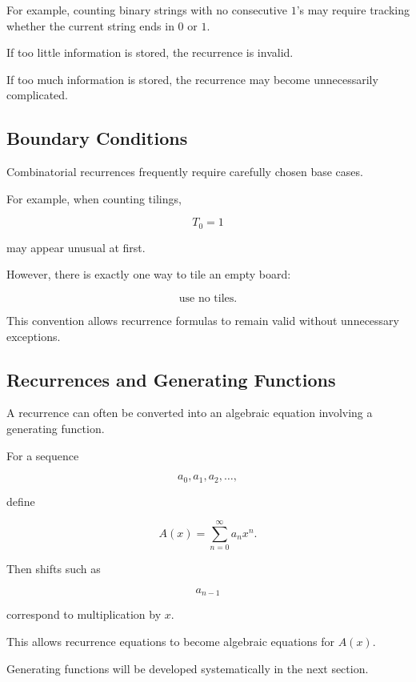For example, counting binary strings with no consecutive \(1\)'s may
require tracking whether the current string ends in \(0\) or \(1\).

If too little information is stored, the recurrence is invalid.

If too much information is stored, the recurrence may become
unnecessarily complicated.

\subsection{Boundary Conditions}
\label{subsec:boundary-conditions-recurrence}

Combinatorial recurrences frequently require carefully chosen base
cases.

For example, when counting tilings,

\[
T_0=1
\]

may appear unusual at first.

However, there is exactly one way to tile an empty board:

\[
\boxed{
\text{use no tiles}.
}
\]

This convention allows recurrence formulas to remain valid without
unnecessary exceptions.

\subsection{Recurrences and Generating Functions}
\label{subsec:recurrences-generating-functions-preview}

A recurrence can often be converted into an algebraic equation involving
a generating function.

For a sequence

\[
a_0,a_1,a_2,\ldots,
\]

define

\[
A(x)
=
\sum_{n=0}^{\infty}a_nx^n.
\]

Then shifts such as

\[
a_{n-1}
\]

correspond to multiplication by \(x\).

This allows recurrence equations to become algebraic equations for
\(A(x)\).

Generating functions will be developed systematically in the next
section.

